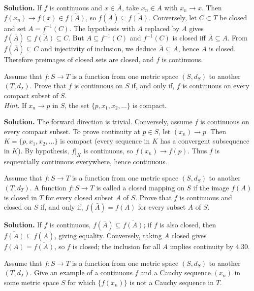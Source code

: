 \noindent\textbf{Solution.}
If $f$ is continuous and $x\in\overline{A}$, take $x_n\in A$ with $x_n\to x$. Then $f(x_n)\to f(x)\in\overline{f(A)}$, so $f(\overline{A})\subseteq\overline{f(A)}$. Conversely, let $C\subset T$ be closed and set $A=f^{-1}(C)$. The hypothesis with $A$ replaced by $A$ gives $f(\overline{A})\subseteq\overline{f(A)}\subseteq C$. But $A\subseteq f^{-1}(C)$ and $f^{-1}(C)$ is closed iff $\overline{A}\subseteq A$. From $f(\overline{A})\subseteq C$ and injectivity of inclusion, we deduce $\overline{A}\subseteq A$, hence $A$ is closed. Therefore preimages of closed sets are closed, and $f$ is continuous.
\medskip

\begin{problembox}
Assume that $f : S \rightarrow T$ is a function from one metric space $(S, d_S)$ to another $(T, d_T)$. Prove that $f$ is continuous on $S$ if, and only if, $f$ is continuous on every compact subset of $S$. \\
\textit{Hint.} If $x_n \rightarrow p$ in $S$, the set $\{p, x_1, x_2, \ldots\}$ is compact.
\end{problembox}

\noindent\textbf{Solution.}
The forward direction is trivial. Conversely, assume $f$ is continuous on every compact subset. To prove continuity at $p\in S$, let $(x_n)\to p$. Then $K=\{p,x_1,x_2,\ldots\}$ is compact (every sequence in $K$ has a convergent subsequence in $K$). By hypothesis, $f|_K$ is continuous, so $f(x_n)\to f(p)$. Thus $f$ is sequentially continuous everywhere, hence continuous.
\medskip

\begin{problembox}
Assume that $f : S \rightarrow T$ is a function from one metric space $(S, d_S)$ to another $(T, d_T)$. A function $f : S \rightarrow T$ is called a closed mapping on $S$ if the image $f(A)$ is closed in $T$ for every closed subset $A$ of $S$. Prove that $f$ is continuous and closed on $S$ if, and only if, $f(\bar{A}) = \overline{f(A)}$ for every subset $A$ of $S$.
\end{problembox}

\noindent\textbf{Solution.}
If $f$ is continuous, $f(\overline{A})\subseteq\overline{f(A)}$; if $f$ is also closed, then $\overline{f(A)}\subseteq f(\overline{A})$, giving equality. Conversely, taking $A$ closed gives $f(A)=\overline{f(A)}$, so $f$ is closed; the inclusion for all $A$ implies continuity by 4.30.
\medskip

\begin{problembox}
Assume that $f : S \rightarrow T$ is a function from one metric space $(S, d_S)$ to another $(T, d_T)$. Give an example of a continuous $f$ and a Cauchy sequence $(x_n)$ in some metric space $S$ for which $\{f(x_n)\}$ is not a Cauchy sequence in $T$.
\end{problembox}

